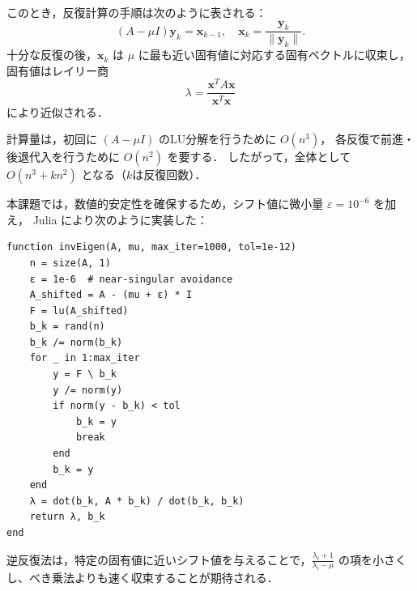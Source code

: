 \documentclass[a4paper,11pt]{ltjsarticle}
\begin{document}
このとき，反復計算の手順は次のように表される：
\[
(A - \mu I) \boldsymbol{y}_{k} = \boldsymbol{x}_{k-1}, \quad
\boldsymbol{x}_{k} = \frac{\boldsymbol{y}_{k}}{\|\boldsymbol{y}_{k}\|}.
\]
十分な反復の後，$\boldsymbol{x}_{k}$ は $\mu$ に最も近い固有値に対応する固有ベクトルに収束し，
固有値はレイリー商
\[
\lambda = \frac{\boldsymbol{x}^{T} A \boldsymbol{x}}{\boldsymbol{x}^{T} \boldsymbol{x}}
\]
により近似される．

計算量は，初回に $(A - \mu I)$ のLU分解を行うために $O(n^3)$，
各反復で前進・後退代入を行うために $O(n^2)$ を要する．
したがって，全体として $O(n^3 + k n^2)$ となる（$k$は反復回数）．

本課題では，数値的安定性を確保するため，シフト値に微小量 $\varepsilon=10^{-6}$ を加え，
Julia により次のように実装した：

\begin{verbatim}
function invEigen(A, mu, max_iter=1000, tol=1e-12)
    n = size(A, 1)
    ε = 1e-6  # near-singular avoidance
    A_shifted = A - (mu + ε) * I
    F = lu(A_shifted)
    b_k = rand(n)
    b_k /= norm(b_k)
    for _ in 1:max_iter
        y = F \ b_k
        y /= norm(y)
        if norm(y - b_k) < tol
            b_k = y
            break
        end
        b_k = y
    end
    λ = dot(b_k, A * b_k) / dot(b_k, b_k)
    return λ, b_k
end
\end{verbatim}



逆反復法は，特定の固有値に近いシフト値を与えることで，$\frac{\lambda_i+1}{\lambda_i - \mu}$ の項を小さくし、べき乗法よりも速く収束することが期待される．
\end{document}
